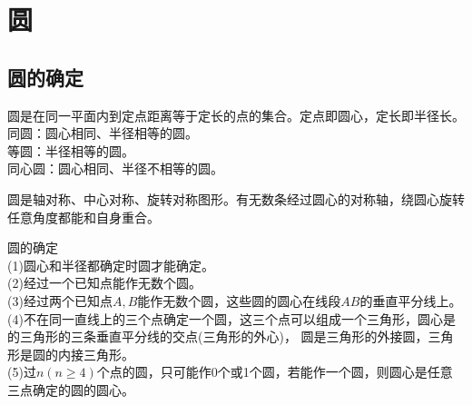 \documentclass{ecnuthesis}
\begin{document}
\chapter{圆}
\section{圆的确定}
\begin{knowledge}
    圆是在同一平面内到定点距离等于定长的点的集合。定点即圆心，定长即半径长。\\
    同圆：圆心相同、半径相等的圆。\\
    等圆：半径相等的圆。\\
    同心圆：圆心相同、半径不相等的圆。
\end{knowledge}
\begin{knowledge}
    圆是轴对称、中心对称、旋转对称图形。有无数条经过圆心的对称轴，绕圆心旋转任意角度都能和自身重合。
\end{knowledge}
\begin{knowledge}
    圆的确定 \\
    (1)圆心和半径都确定时圆才能确定。\\
    (2)经过一个已知点能作无数个圆。 \\
    (3)经过两个已知点$A,B$能作无数个圆，这些圆的圆心在线段$AB$的垂直平分线上。\\
    (4)不在同一直线上的三个点确定一个圆，这三个点可以组成一个三角形，圆心是的三角形的三条垂直平分线的交点(三角形的外心)，
    圆是三角形的外接圆，三角形是圆的内接三角形。\\
    (5)过$n(n\ge 4)$个点的圆，只可能作0个或1个圆，若能作一个圆，则圆心是任意三点确定的圆的圆心。
\end{knowledge}
\clearpage
\end{document}
